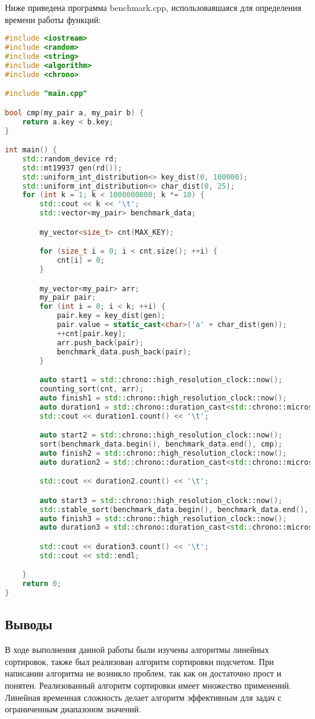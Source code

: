 \documentclass[12pt]{article}
\begin{document}
Ниже приведена программа benchmark.cpp, использовавшаяся для определения времени работы функций:
\begin{lstlisting}[language=C++]
#include <iostream>
#include <random>
#include <string>
#include <algorithm>
#include <chrono>

#include "main.cpp"

bool cmp(my_pair a, my_pair b) {
    return a.key < b.key;
}

int main() {
    std::random_device rd;
    std::mt19937 gen(rd());
    std::uniform_int_distribution<> key_dist(0, 100000);
    std::uniform_int_distribution<> char_dist(0, 25);
    for (int k = 1; k < 1000000000; k *= 10) {
        std::cout << k << '\t';
        std::vector<my_pair> benchmark_data;

        my_vector<size_t> cnt(MAX_KEY);

        for (size_t i = 0; i < cnt.size(); ++i) {
            cnt[i] = 0;
        }

        my_vector<my_pair> arr;
        my_pair pair;
        for (int i = 0; i < k; ++i) {
            pair.key = key_dist(gen);
            pair.value = static_cast<char>('a' + char_dist(gen));
            ++cnt[pair.key];
            arr.push_back(pair);
            benchmark_data.push_back(pair);
        }

        auto start1 = std::chrono::high_resolution_clock::now();
        counting_sort(cnt, arr);
        auto finish1 = std::chrono::high_resolution_clock::now();
        auto duration1 = std::chrono::duration_cast<std::chrono::microseconds>(finish1 - start1);
        std::cout << duration1.count() << '\t';

        auto start2 = std::chrono::high_resolution_clock::now();
        sort(benchmark_data.begin(), benchmark_data.end(), cmp);
        auto finish2 = std::chrono::high_resolution_clock::now();
        auto duration2 = std::chrono::duration_cast<std::chrono::microseconds>(finish2 - start2);

        std::cout << duration2.count() << '\t';

        auto start3 = std::chrono::high_resolution_clock::now();
        std::stable_sort(benchmark_data.begin(), benchmark_data.end(), cmp);
        auto finish3 = std::chrono::high_resolution_clock::now();
        auto duration3 = std::chrono::duration_cast<std::chrono::microseconds>(finish3 - start3);

        std::cout << duration3.count() << '\t';
        std::cout << std::endl;

    }
    return 0;
}


\end{lstlisting}

\subsection*{Выводы}

В ходе выполнения данной работы были изучены алгоритмы линейных сортировок, также был реализован алгоритм сортировки подсчетом. При написании алгоритма не возникло проблем, так как он достаточно прост и понятен. Реализованный алгоритм сортировки имеет множество применений. Линейная временная сложность делает алгоритм эффективным для задач с ограниченным диапазоном значений.
\end{document}
